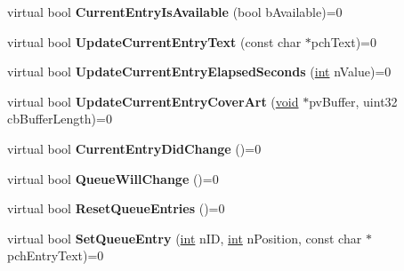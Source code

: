 \begin{DoxyCompactItemize}
\item 
\hypertarget{classISteamMusicRemote_a4a54354f3968b4ffc61613582e158486}{}virtual bool {\bfseries Current\+Entry\+Is\+Available} (bool b\+Available)=0\label{classISteamMusicRemote_a4a54354f3968b4ffc61613582e158486}

\item 
\hypertarget{classISteamMusicRemote_ad2bf0215a5af5fcb912fd7cc22fa04f9}{}virtual bool {\bfseries Update\+Current\+Entry\+Text} (const char $\ast$pch\+Text)=0\label{classISteamMusicRemote_ad2bf0215a5af5fcb912fd7cc22fa04f9}

\item 
\hypertarget{classISteamMusicRemote_a493371400c91a982929bf518f39f49db}{}virtual bool {\bfseries Update\+Current\+Entry\+Elapsed\+Seconds} (\hyperlink{SDL__thread_8h_a6a64f9be4433e4de6e2f2f548cf3c08e}{int} n\+Value)=0\label{classISteamMusicRemote_a493371400c91a982929bf518f39f49db}

\item 
\hypertarget{classISteamMusicRemote_a4ee4b88daf939894a8f470d289e60579}{}virtual bool {\bfseries Update\+Current\+Entry\+Cover\+Art} (\hyperlink{SDL__audio_8h_a52835ae37c4bb905b903cbaf5d04b05f}{void} $\ast$pv\+Buffer, uint32 cb\+Buffer\+Length)=0\label{classISteamMusicRemote_a4ee4b88daf939894a8f470d289e60579}

\item 
\hypertarget{classISteamMusicRemote_abd66e7e611456456c4bee2b4768b1393}{}virtual bool {\bfseries Current\+Entry\+Did\+Change} ()=0\label{classISteamMusicRemote_abd66e7e611456456c4bee2b4768b1393}

\item 
\hypertarget{classISteamMusicRemote_a10c849a7d48e5b3054b9d996e18e585b}{}virtual bool {\bfseries Queue\+Will\+Change} ()=0\label{classISteamMusicRemote_a10c849a7d48e5b3054b9d996e18e585b}

\item 
\hypertarget{classISteamMusicRemote_a738bf3d6be02b09a445081de31687033}{}virtual bool {\bfseries Reset\+Queue\+Entries} ()=0\label{classISteamMusicRemote_a738bf3d6be02b09a445081de31687033}

\item 
\hypertarget{classISteamMusicRemote_a544a9fdf6761151e7a04fd378c096b33}{}virtual bool {\bfseries Set\+Queue\+Entry} (\hyperlink{SDL__thread_8h_a6a64f9be4433e4de6e2f2f548cf3c08e}{int} n\+I\+D, \hyperlink{SDL__thread_8h_a6a64f9be4433e4de6e2f2f548cf3c08e}{int} n\+Position, const char $\ast$pch\+Entry\+Text)=0\label{classISteamMusicRemote_a544a9fdf6761151e7a04fd378c096b33}


\end{DoxyCompactItemize}
